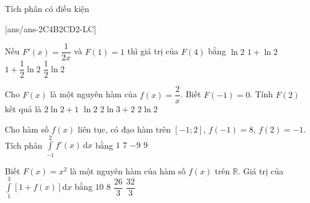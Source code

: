 \begin{dang}{Tích phân có điều kiện}
\end{dang}
\TN
{}[ans/ans-2C4B2CD2-LC]
\begin{ex}%
	Nếu $F'(x) = \dfrac{1}{2x}$ và $F(1) = 1$ thì giá trị của $F(4)$ bằng
	\choice
	{$\ln 2$}
	{\True $1 + \ln 2$}
	{$1 + \dfrac{1}{2} \ln 2 $}
	{$ \dfrac{1}{2} \ln 2 $}
\end{ex}
\begin{ex}%
	Cho $F(x)$ là một nguyên hàm của $f(x) = \dfrac{2}{x}$. Biết $F(-1) = 0$. Tính $F(2)$ kết quả là
	\choice
	{$2 \ln 2 + 1$}
	{$\ln 2$}
	{$ 2 \ln 3 + 2$}
	{\True $2 \ln 2 $}
\end{ex}
\begin{ex}%
	Cho hàm số $f(x)$ liên tục, có đạo hàm trên $[-1;2]$, $f(-1) = 8$, $f(2) = -1$. Tích phân $\displaystyle\int\limits_{-1}^{2} f'(x) \, \mathrm{d}x$ bằng
	\choice
	{$1$}
	{$7$}
	{\True $-9$}
	{$9$}
\end{ex}
\begin{ex}%
	Biết $F(x) = x^2$ là một nguyên hàm của hàm số $f(x)$ trên $\mathbb{R}$. Giá trị của $\displaystyle\int\limits_{1}^{3} \left[ 1 + f(x) \right] \mathrm{d}x$ bằng
	\choice
	{\True $10$}
	{$8$}
	{$ \dfrac{26}{3}$}
	{$ \dfrac{32}{3}$}


\end{ex}
